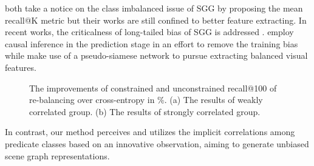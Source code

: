 \documentclass[sigconf]{acmart}
\begin{document}
\citet{chen19,tang19} both take a notice on the class imbalanced issue of SGG by proposing the mean recall@K metric but their works are still confined to better feature extracting. In recent works, the criticalness of long-tailed bias of SGG is addressed \cite{tang20,wen20}. \citet{tang20} employ causal inference in the prediction stage in an effort to remove the training bias while \citet{wen20} make use of a pseudo-siamese network to pursue extracting balanced visual features. 
\begin{figure}[htbp]
\centering
 

\centering
\caption{The improvements of constrained and unconstrained recall@100 of re-balancing over cross-entropy in \%. (a) The results of weakly correlated group. (b) The results of strongly correlated group.}
\vspace{-0.2cm}
\label{fig:re-weighting-entropy_compare}
\end{figure}
In contrast, our method perceives and utilizes the implicit correlations among predicate classes based on an innovative observation, aiming to generate unbiased scene graph representations.
\end{document}
